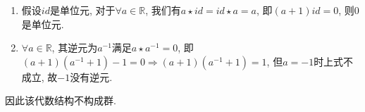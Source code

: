 \documentclass[a4paper,12pt]{ctexart}
\begin{document}
\begin{enumerate}[label=(\arabic{*})]
\begin{enumerate}
            \item 假设$id$是单位元, 对于$\forall a\in\mathbb{R}$, 我们有$a\star id=id\star a=a$, 即$(a+1)id=0$, 则$0$是单位元.
            \item $\forall a\in\mathbb{R}$, 其逆元为$a^{-1}$满足$a\star a^{-1}=0$, 即$(a+1)(a^{-1}+1)-1=0\Rightarrow (a+1)(a^{-1}+1)=1$, 但$a=-1$时上式不成立, 故$-1$没有逆元.
        \end{enumerate} 
        因此该代数结构不构成群.
    \end{enumerate}
\end{document}
